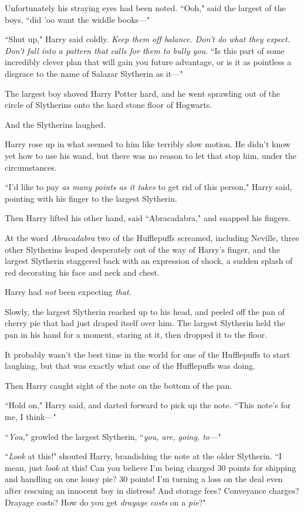 Unfortunately his straying eyes had been noted. ``Ooh," said the largest of the boys, ``did 'oo want the widdle books—"

``Shut up," Harry said coldly. \emph{Keep them off balance. Don't do what they expect. Don't fall into a pattern that calls for them to bully you.} ``Is this part of some incredibly clever plan that will gain you future advantage, or is it as pointless a disgrace to the name of Salazar Slytherin as it—"

The largest boy shoved Harry Potter hard, and he went sprawling out of the circle of Slytherins onto the hard stone floor of Hogwarts.

And the Slytherins laughed.

Harry rose up in what seemed to him like terribly slow motion. He didn't know yet how to use his wand, but there was no reason to let that stop him, under the circumstances.

``I'd like to pay \emph{as many points as it takes} to get rid of this person," Harry said, pointing with his finger to the largest Slytherin.

Then Harry lifted his other hand, said ``Abracadabra," and snapped his fingers.

At the word \emph{Abracadabra} two of the Hufflepuffs screamed, including Neville, three other Slytherins leaped desperately out of the way of Harry's finger, and the largest Slytherin staggered back with an expression of shock, a sudden splash of red decorating his face and neck and chest.

Harry had \emph{not} been expecting \emph{that}.

Slowly, the largest Slytherin reached up to his head, and peeled off the pan of cherry pie that had just draped itself over him. The largest Slytherin held the pan in his hand for a moment, staring at it, then dropped it to the floor.

It probably wasn't the best time in the world for one of the Hufflepuffs to start laughing, but that was exactly what one of the Hufflepuffs was doing.

Then Harry caught sight of the note on the bottom of the pan.

``Hold on," Harry said, and darted forward to pick up the note. ``This note's for me, I think—"

``\emph{You,}" growled the largest Slytherin, ``\emph{you, are, going, to—}"

``\emph{Look} at this!" shouted Harry, brandishing the note at the older Slytherin. ``I mean, just \emph{look} at this! Can you believe I'm being charged 30 points for shipping and handling on one lousy pie? 30 points! I'm turning a loss on the deal even after rescuing an innocent boy in distress! And storage fees? Conveyance charges? Drayage costs? How do you get \emph{drayage costs} on a \emph{pie}?"

